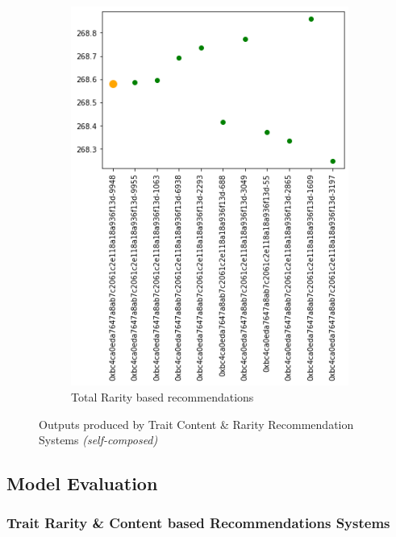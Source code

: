 \begin{figure}[h!]
\begin{subfigure}[b]{0.45\textwidth}
         \includegraphics[width=\textwidth]{images/Testing/Trait rarity representation graph - rarity recommendations.png}
         \caption{Total Rarity based recommendations}
         \label{fig:total-rarity-output}
     \end{subfigure}
     \hfill
        \caption{Outputs produced by Trait Content \& Rarity Recommendation Systems \textit{(self-composed)}}
        \label{fig:trait-recs-outputs}
\end{figure}





\subsection{Model Evaluation}

\subsubsection{Trait Rarity \& Content based Recommendations Systems}

